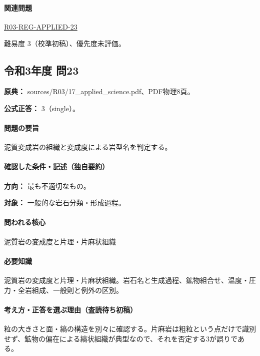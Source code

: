 \paragraph{関連問題} \hyperref[q:r03-reg-applied-23]{R03-REG-APPLIED-23}

\par 難易度 3（校準初稿）、優先度未評価。

\subsection{令和3年度 問23}
\label{q:r03-reg-applied-23}

\noindent\textbf{原典：} sources/R03/17\_applied\_science.pdf、PDF物理8頁。

\textbf{公式正答：} 3（single）。

\paragraph{問題の要旨} 泥質変成岩の組織と変成度による岩型名を判定する。

\paragraph{確認した条件・記述（独自要約）}\mbox{}\par

\noindent\textbf{方向：} 最も不適切なもの。\par

\noindent\textbf{対象：} 一般的な岩石分類・形成過程。\par

\paragraph{問われる核心} 泥質岩の変成度と片理・片麻状組織

\paragraph{必要知識} 泥質岩の変成度と片理・片麻状組織。岩石名と生成過程、鉱物組合せ、温度・圧力・全岩組成、一般則と例外の区別。

\paragraph{考え方・正答を選ぶ理由（査読待ち初稿）} 粒の大きさと面・縞の構造を別々に確認する。片麻岩は粗粒という点だけで識別せず、鉱物の偏在による縞状組織が典型なので、それを否定する3が誤りである。

